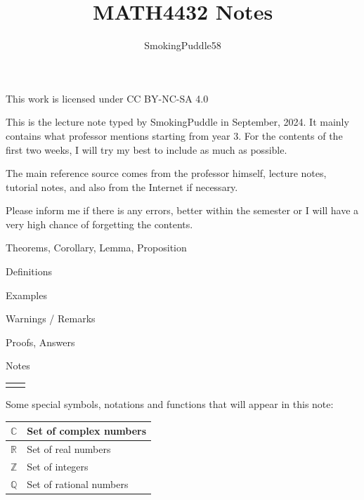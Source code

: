 \documentclass{article}
\title{MATH4432 Notes}
\author{SmokingPuddle58}
\theoremstyle{MyNonumberplain}
\theoremstyle{break}
\newcommand{\R}{\mathbb{R}}
\newcommand{\Q}{\mathbb{Q}}
\newcommand{\Z}{\mathbb{Z}}
\newcommand{\C}{\mathbb{C}}
\theoremstyle{break}
\theoremstyle{break}
\theoremstyle{break}
\begin{document}
\maketitle

\begin{center}
    This work is licensed under CC BY-NC-SA 4.0
\end{center}


\newpage

    This is the lecture note typed by SmokingPuddle in September, 2024. It mainly contains what professor mentions starting from year 3. For the contents of the first two weeks, I will try my best to include as much as possible. 

    The main reference source comes from the professor himself, lecture notes, tutorial notes, and also from the Internet if necessary.

    Please inform me if there is any errors, better within the semester or I will have a very high chance of forgetting the contents. 

    \bigskip


\begin{thmbox}
    Theorems, Corollary, Lemma, Proposition
\end{thmbox}

\begin{defbox}
    Definitions
\end{defbox}

\begin{expbox}
    Examples
\end{expbox}

\begin{warnbox}
    Warnings / Remarks
\end{warnbox}

\begin{prfbox}
    Proofs, Answers
\end{prfbox}

\begin{notebox}
    Notes
\end{notebox}

\begin{tabular}{ll}
    &\\
\end{tabular}

Some special symbols, notations and functions that will appear in this note:\bigskip

\begin{center}

    \begin{tabular}{|l|l|}
        \hline
        $\C$ & Set of complex numbers \\ \hline
        $\R$ & Set of real numbers \\ \hline
        $\Z$ & Set of integers \\ \hline
        $\Q$ & Set of rational numbers \\ \hline
    \end{tabular}
\end{center}
\begin{center}
    

\end{center}
\end{document}
